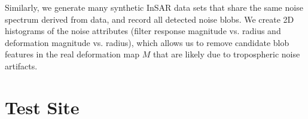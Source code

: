 Similarly, we generate many synthetic InSAR data sets that share the same noise spectrum derived from data, and record all detected noise blobs. We create 2D histograms of the noise attributes (filter response magnitude vs. radius and deformation magnitude vs. radius), which allows us to remove candidate blob features in the real deformation map $M$ that are likely due to tropospheric noise artifacts.


\section{Test Site}
\label{sec:site}






